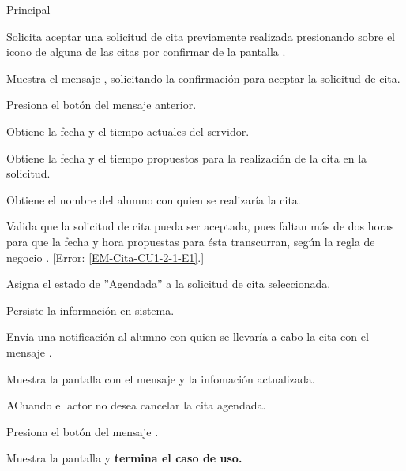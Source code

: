 \begin{UCtrayectoria}{Principal}

	\UCpaso [\UCactor] Solicita aceptar una solicitud de cita previamente realizada presionando sobre el icono  de alguna de las citas por confirmar de la pantalla .

	\UCpaso Muestra el mensaje , solicitando la confirmación para aceptar la solicitud de cita. 

	\UCpaso Presiona el botón  del mensaje anterior.  
 
	\UCpaso Obtiene la fecha y el tiempo actuales del servidor.

	\UCpaso Obtiene la fecha y el tiempo propuestos para la realización de la cita en la solicitud.

	\UCpaso Obtiene el nombre del alumno con quien se realizaría la cita. 

	\UCpaso Valida que la solicitud de cita pueda ser aceptada, pues faltan más de dos horas para que la fecha y hora propuestas para ésta transcurran, según la regla de negocio . [Error: \ref{EM-Cita-CU1-2-1-E1}.] 

	\UCpaso Asigna el estado de ''Agendada'' a la solicitud de cita seleccionada. 

	\UCpaso Persiste la información en sistema. 

	\UCpaso Envía una notificación al alumno con quien se llevaría a cabo la cita con el mensaje .

	\UCpaso Muestra la pantalla  con el mensaje  y la infomación actualizada.
	

\end{UCtrayectoria}

\begin{UCtrayectoriaA}{A}{Cuando el actor no desea cancelar la cita agendada.}

	\UCpaso Presiona el botón  del mensaje .

	\UCpaso Muestra la pantalla  y \textbf{termina el caso de uso.}

\end{UCtrayectoriaA}
